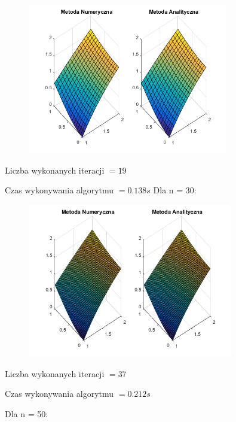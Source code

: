 \begin{figure}[!ht]
	\begin{center}
		\includegraphics[width=0.78\textwidth]{Lab6/charts/pr/zad1/15.png}
	\end{center}
\end{figure}


Liczba wykonanych iteracji $ = 19 $

Czas wykonywania algorytmu $ = 0.138 s$
\newpage
Dla n = 30:

\begin{figure}[!ht]
	\begin{center}
		\includegraphics[width=0.8\textwidth]{Lab6/charts/pr/zad1/30.png}
	\end{center}
\end{figure}

Liczba wykonanych iteracji $ = 37 $

Czas wykonywania algorytmu $ = 0.212 s$



Dla n = 50:

